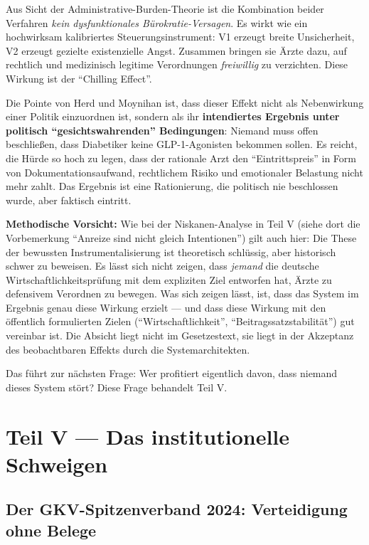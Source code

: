 \documentclass{umbruch-position}
\begin{document}
Aus Sicht der Administrative-Burden-Theorie ist die Kombination beider Verfahren \textit{kein dysfunktionales Bürokratie-Versagen}. Es wirkt wie ein hochwirksam kalibriertes Steuerungsinstrument: V1 erzeugt breite Unsicherheit, V2 erzeugt gezielte existenzielle Angst. Zusammen bringen sie Ärzte dazu, auf rechtlich und medizinisch legitime Verordnungen \textit{freiwillig} zu verzichten. Diese Wirkung ist der ``Chilling Effect''.

Die Pointe von Herd und Moynihan ist, dass dieser Effekt nicht als Nebenwirkung einer Politik einzuordnen ist, sondern als ihr \textbf{intendiertes Ergebnis unter politisch ``gesichtswahrenden'' Bedingungen}: Niemand muss offen beschließen, dass Diabetiker keine GLP-1-Agonisten bekommen sollen. Es reicht, die Hürde so hoch zu legen, dass der rationale Arzt den ``Eintrittspreis'' in Form von Dokumentationsaufwand, rechtlichem Risiko und emotionaler Belastung nicht mehr zahlt. Das Ergebnis ist eine Rationierung, die politisch nie beschlossen wurde, aber faktisch eintritt.

\textbf{Methodische Vorsicht:} Wie bei der Niskanen-Analyse in Teil V (siehe dort die Vorbemerkung ``Anreize sind nicht gleich Intentionen'') gilt auch hier: Die These der bewussten Instrumentalisierung ist theoretisch schlüssig, aber historisch schwer zu beweisen. Es lässt sich nicht zeigen, dass \textit{jemand} die deutsche Wirtschaftlichkeitsprüfung mit dem expliziten Ziel entworfen hat, Ärzte zu defensivem Verordnen zu bewegen. Was sich zeigen lässt, ist, dass das System im Ergebnis genau diese Wirkung erzielt --- und dass diese Wirkung mit den öffentlich formulierten Zielen (``Wirtschaftlichkeit'', ``Beitragssatzstabilität'') gut vereinbar ist. Die Absicht liegt nicht im Gesetzestext, sie liegt in der Akzeptanz des beobachtbaren Effekts durch die Systemarchitekten.

Das führt zur nächsten Frage: Wer profitiert eigentlich davon, dass niemand dieses System stört? Diese Frage behandelt Teil V.


\section{Teil V --- Das institutionelle Schweigen}

\subsection{Der GKV-Spitzenverband 2024: Verteidigung ohne Belege}
\end{document}
